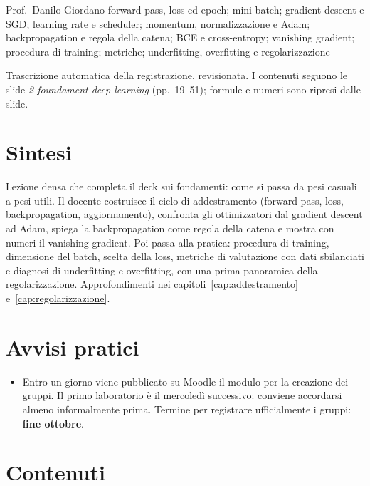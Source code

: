   {Prof.~Danilo Giordano}
  {forward pass, loss ed epoch; mini-batch; gradient descent e SGD; learning rate e scheduler;
   momentum, normalizzazione e Adam; backpropagation e regola della catena; BCE e cross-entropy;
   vanishing gradient; procedura di training; metriche; underfitting, overfitting e regolarizzazione}
\label{lez:2026-09-30}

\begin{nota}[Fonte]
Trascrizione automatica della registrazione, revisionata. I contenuti seguono le slide
\emph{2-foundament-deep-learning} (pp.~19--51); formule e numeri sono ripresi dalle slide.
\end{nota}

\section{Sintesi}
Lezione densa che completa il deck sui fondamenti: come si passa da pesi casuali a pesi utili. Il
docente costruisce il ciclo di addestramento (forward pass, loss, backpropagation, aggiornamento),
confronta gli ottimizzatori dal gradient descent ad Adam, spiega la backpropagation come regola della
catena e mostra con numeri il vanishing gradient. Poi passa alla pratica: procedura di training,
dimensione del batch, scelta della loss, metriche di valutazione con dati sbilanciati e diagnosi di
underfitting e overfitting, con una prima panoramica della regolarizzazione. Approfondimenti nei
capitoli~\ref{cap:addestramento} e~\ref{cap:regolarizzazione}.

\section{Avvisi pratici}
\begin{itemize}
  \item Entro un giorno viene pubblicato su Moodle il modulo per la creazione dei gruppi. Il primo
    laboratorio è il mercoledì successivo: conviene accordarsi almeno informalmente prima. Termine per
    registrare ufficialmente i gruppi: \textbf{fine ottobre}.
\end{itemize}

\section{Contenuti}

